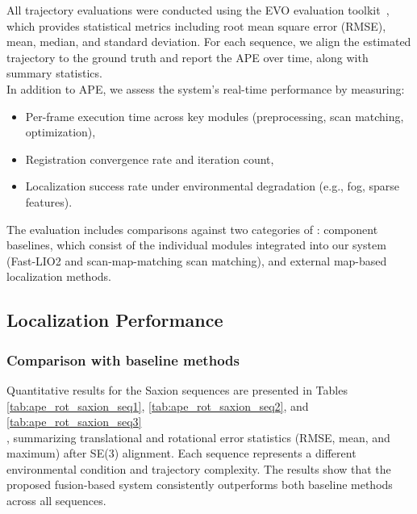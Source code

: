 All trajectory evaluations were conducted using the EVO evaluation toolkit~\cite{grupp2017evo}, which provides statistical metrics including root mean square error (RMSE), mean, median, and standard deviation. For each sequence, we align the estimated trajectory to the ground truth and report the APE over time, along with summary statistics.\\
In addition to APE, we assess the system's real-time performance by measuring:
\begin{itemize}
	\item Per-frame execution time across key modules (preprocessing, scan matching, optimization),
	\item Registration convergence rate and iteration count,
	\item Localization success rate under environmental degradation (e.g., fog, sparse features).
\end{itemize}


The evaluation includes comparisons against two categories of : component baselines, which consist of the individual modules integrated into our system (Fast-LIO2\cite{xuFastLIO2} and scan-map-matching scan matching), and external map-based localization methods.

\subsection{ Localization Performance}
\subsubsection{Comparison with baseline methods }
Quantitative results for the Saxion sequences are presented in Tables \ref{tab:ape_rot_saxion_seq1}, \ref{tab:ape_rot_saxion_seq2}, and  \ref{tab:ape_rot_saxion_seq3}\\
, summarizing translational and rotational error statistics (RMSE, mean, and maximum) after SE(3) alignment. Each sequence represents a different environmental condition and trajectory complexity. The results show that the proposed fusion-based system consistently outperforms both baseline methods across all sequences.

